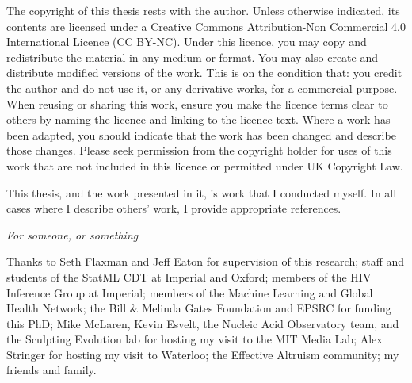\documentclass[a4paper, nobind]{templates/ociamthesis}
\begin{document}
\setcounter{secnumdepth}{2}
\setcounter{tocdepth}{1}



\begin{romanpages}

\maketitle

\begin{copyrights}
  The copyright of this thesis rests with the author. Unless otherwise indicated, its contents are licensed under a Creative Commons Attribution-Non Commercial 4.0 International Licence (CC BY-NC).
  Under this licence, you may copy and redistribute the material in any medium or format. You may also create and distribute modified versions of the work.
  This is on the condition that: you credit the author and do not use it, or any derivative works, for a commercial purpose.
  When reusing or sharing this work, ensure you make the licence terms clear to others by naming the licence and linking to the licence text.
  Where a work has been adapted, you should indicate that the work has been changed and describe those changes.
  Please seek permission from the copyright holder for uses of this work that are not included in this licence or permitted under UK Copyright Law.
\end{copyrights}

\begin{originality}
  This thesis, and the work presented in it, is work that I conducted myself.
  In all cases where I describe others' work, I provide appropriate references.
\end{originality}

\begin{dedication}
  \textit{For someone, or something}
\end{dedication}

\begin{acknowledgements}
 	Thanks to Seth Flaxman and Jeff Eaton for supervision of this research;
 staff and students of the StatML CDT at Imperial and Oxford;
 members of the HIV Inference Group at Imperial;
 members of the Machine Learning and Global Health Network;
 the Bill \& Melinda Gates Foundation and EPSRC for funding this PhD;
 Mike McLaren, Kevin Esvelt, the Nucleic Acid Observatory team, and the Sculpting Evolution lab for hosting my visit to the MIT Media Lab;
 Alex Stringer for hosting my visit to Waterloo;
 the Effective Altruism community;
 my friends and family.


\end{acknowledgements}
\end{romanpages}
\end{document}
